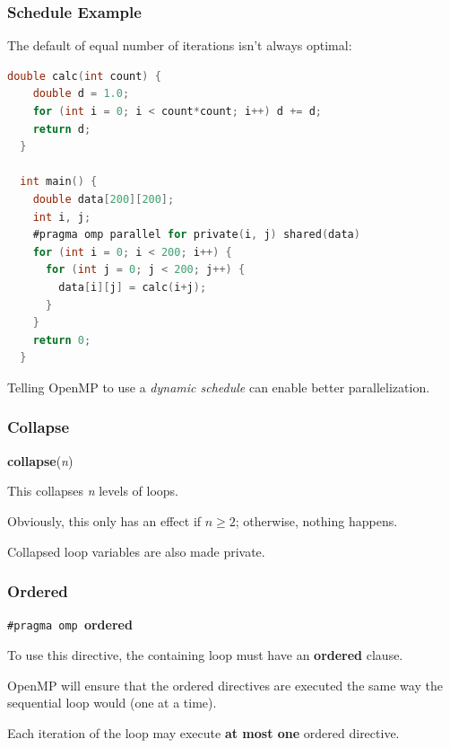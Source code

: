 \begin{frame}[fragile]
\frametitle{Schedule Example}

The default of equal number of iterations isn't always optimal:

\begin{lstlisting}[language=C,morekeywords={foreach,pragma,omp,parallel,single,nowait,task,untied,barrier,taskyield}]
  double calc(int count) {
    double d = 1.0;
    for (int i = 0; i < count*count; i++) d += d;
    return d;
  }

  int main() {
    double data[200][200];
    int i, j;
    #pragma omp parallel for private(i, j) shared(data)
    for (int i = 0; i < 200; i++) {
      for (int j = 0; j < 200; j++) {
        data[i][j] = calc(i+j);
      }
    }
    return 0;
  }
\end{lstlisting}

Telling OpenMP to use a \emph{dynamic schedule} can enable better
parallelization.

\end{frame}


\begin{frame}
\frametitle{Collapse}

  \begin{center}
    {\bf collapse}({\it n})
  \end{center}

    This collapses {\it n} levels of loops. 
    
    Obviously, this only has
    an effect if $n \ge 2$; otherwise, nothing happens. 
    
    Collapsed loop
    variables are also made private.


\end{frame}


\begin{frame}
\frametitle{Ordered}

 \begin{center}
    {\tt \#pragma omp }{\bf ordered}
  \end{center}

    To use this directive, the containing loop must have an {\bf ordered} clause.
   
   
    OpenMP will ensure that the ordered directives are executed the same
      way the sequential loop would (one at a time).
  
  
    Each iteration of the loop may execute {\bf at most one} ordered
      directive.

\end{frame}


